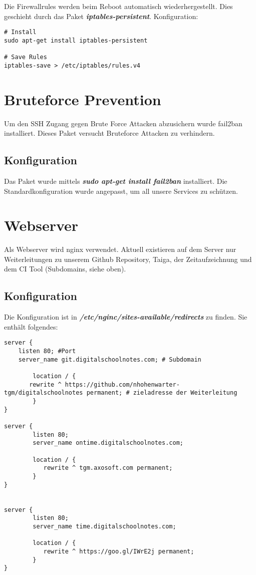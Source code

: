 \documentclass[12pt,a4paper,oneside,ngerman]{scrartcl}
\begin{document}
Die Firewallrules werden beim Reboot automatisch wiederhergestellt. Dies geschieht durch das Paket \textbf{\textit{iptables-persistent}}. Konfiguration\cite{HOWTO:2}:

\begin{lstlisting}
# Install
sudo apt-get install iptables-persistent

# Save Rules
iptables-save > /etc/iptables/rules.v4
\end{lstlisting}

\section{Bruteforce Prevention}
Um den SSH Zugang gegen Brute Force Attacken abzusichern wurde fail2ban installiert. Dieses Paket versucht Bruteforce Attacken zu verhindern. \cite{HOWTO:1} \\

\subsection{Konfiguration}
Das Paket wurde mittels \textbf{\textit{sudo apt-get install fail2ban}} installiert. Die Standardkonfiguration wurde angepasst, um all unsere Services zu schützen.

\section{Webserver}
Als Webserver wird nginx verwendet. Aktuell existieren auf dem Server nur Weiterleitungen zu unserem Github Repository, Taiga, der Zeitaufzeichnung und dem CI Tool (Subdomains, siehe oben).

\subsection{Konfiguration}
Die Konfiguration ist in \textbf{\textit{/etc/nginc/sites-available/redirects}} zu finden. Sie enthält folgendes:

\begin{lstlisting}
server {
	listen 80; #Port
	server_name git.digitalschoolnotes.com; # Subdomain

    	location / {
	   rewrite ^ https://github.com/nhohenwarter-tgm/digitalschoolnotes permanent; # zieladresse der Weiterleitung
    	}
}

server {
        listen 80;
        server_name ontime.digitalschoolnotes.com;

        location / {
           rewrite ^ tgm.axosoft.com permanent;
        }
}


server {
        listen 80;
        server_name time.digitalschoolnotes.com;

        location / {
           rewrite ^ https://goo.gl/IWrE2j permanent;
        }
}

\end{lstlisting}
\end{document}
